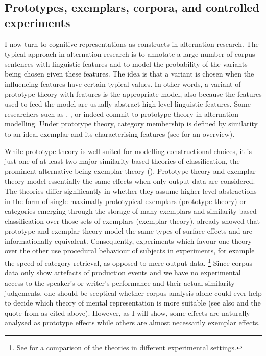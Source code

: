 \subsection{Prototypes, exemplars, corpora, and controlled experiments}
\label{sec:prototypesexemplarscorporaandcontrolledexperiments}

I now turn to cognitive representations as constructs in alternation research.
The typical approach in alternation research is to annotate a large number of corpus sentences with linguistic features and to model the probability of the variants being chosen given these features.
The idea is that a variant is chosen when the influencing features have certain typical values.
In other words, a variant of prototype theory with features \citep{Rosch1978} is the appropriate model, also because the features used to feed the model are usually abstract high-level linguistic features. 
Some researchers such as \cite{Gries2003}, \cite{NessetJanda2010}, or \cite{Schaefer2016c} indeed commit to prototype theory in alternation modelling.
Under prototype theory, category membership is defined by similarity to an ideal exemplar and its characterising features (see \citealp{Taylor2008} for an overview).

While prototype theory is well suited for modelling constructional choices, it is just one of at least two major similarity-based theories of classification, the prominent alternative being exemplar theory (\citealp{MedinSchaffer1978,Hintzman1986}).
Prototype theory and exemplar theory model essentially the same effects when only output data are considered.
The theories differ significantly in whether they assume higher-level abstractions in the form of single maximally prototypical exemplars (prototype theory) or categories emerging through the storage of many exemplars and similarity-based classification over those sets of exemplars (exemplar theory).
\cite{Barsalou1990} already showed that prototype and exemplar theory model the same types of surface effects and are informationally equivalent.
Consequently, experiments which favour one theory over the other use procedural behaviour of subjects in experiments, for example the speed of category retrieval, as opposed to mere output data.%
\footnote{See \citet{StormsEa2000} for a comparison of the theories in different experimental settings.}
Since corpus data only show artefacts of production events and we have no experimental access to the speaker's or writer's performance and their actual similarity judgements, one should be sceptical whether corpus analysis alone could ever help to decide which theory of mental representation is more suitable (see also \citealp[22]{Gries2003} and the quote from \citealp[486--487]{Dabrowska2016} as cited above).
However, as I will show, some effects are naturally analysed as prototype effects while others are almost necessarily exemplar effects.

